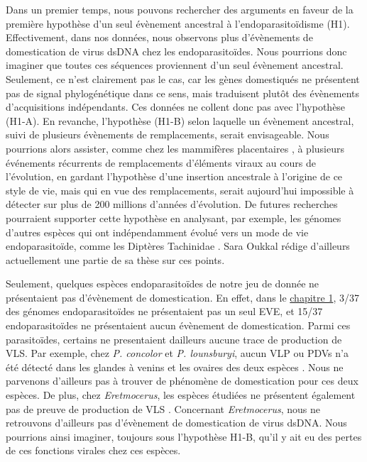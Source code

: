 Dans un premier temps, nous pouvons rechercher des arguments en faveur de la première hypothèse d'un seul évènement ancestral à l'endoparasitoïdisme (H1). Effectivement, dans nos données, nous observons plus d'évènements de domestication de virus dsDNA chez les endoparasitoïdes. Nous pourrions donc imaginer que toutes ces séquences proviennent d'un seul évènement ancestral. Seulement, ce n'est clairement pas le cas, car les gènes domestiqués ne présentent pas de signal phylogénétique dans ce sens, mais traduisent plutôt des évènements d'acquisitions indépendants. Ces données ne collent donc pas avec l'hypothèse (H1-A). En  revanche, l'hypothèse (H1-B) selon laquelle un évènement ancestral, suivi de plusieurs évènements de remplacements, serait envisageable.  Nous pourrions alors assister, comme chez les mammifères placentaires \citep{lavialle_paleovirology_2013}, à plusieurs événements récurrents de remplacements d'éléments viraux au cours de l'évolution, en gardant l'hypothèse d'une insertion ancestrale à l'origine de ce style de vie, mais qui en vue des remplacements, serait aujourd'hui impossible à détecter sur plus de 200 millions d'années d'évolution. De futures recherches pourraient supporter cette hypothèse en analysant, par exemple, les génomes d'autres espèces qui ont indépendamment évolué vers un mode de vie endoparasitoïde, comme les Diptères Tachinidae \citep{stireman_tachinidae_2006}. Sara Oukkal rédige d'ailleurs actuellement une partie de sa thèse sur ces points. 

Seulement, quelques espèces endoparasitoïdes de notre jeu de donnée ne présentaient pas d'évènement de domestication. En effet, dans le \hyperref[sec:chap1]{chapitre 1}, 3/37 des génomes endoparasitoïdes ne présentaient pas un seul EVE, et 15/37 endoparasitoïdes ne présentaient aucun évènement de domestication. Parmi ces parasitoïdes, certains ne presentaient dailleurs aucune trace de production de VLS. Par exemple, chez \textit{P. concolor} et \textit{P. lounsburyi}, aucun VLP ou PDVs n'a été détecté dans les glandes à venins et les ovaires des deux espèces \citep{mathe-hubert_comparative_2016}. Nous ne parvenons d'ailleurs pas à trouver de phénomène de domestication pour ces deux espèces. De plus, chez \textit{Eretmocerus}, les espèces étudiées ne présentent également pas de preuve de production de VLS \citep{gelman_host-parasite_2005}. Concernant \textit{Eretmocerus}, nous ne retrouvons d'ailleurs pas d'évènement de domestication de virus dsDNA. Nous pourrions ainsi imaginer, toujours sous l'hypothèse H1-B, qu'il y ait eu des pertes de ces fonctions virales chez ces espèces.


